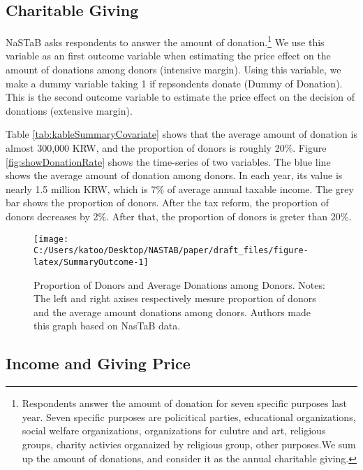 \documentclass[
]{article}
\begin{document}
\hypertarget{charitable-giving}{%
\subsection{Charitable Giving}\label{charitable-giving}}

NaSTaB asks respondents to answer the amount of donation.\footnote{Respondents answer the amount of donation for seven specific purposes last year. Seven specific purposes are policitical parties, educational organizations, social welfare organizations, organizations for culutre and art, religious groups, charity activies organaized by religious group, other purposes.We sum up the amount of donations, and consider it as the annual charitable giving.}
We use this variable as an first outcome variable when
estimating the price effect on the amount of donations among donors (intensive margin).
Using this variable, we make a dummy variable taking 1 if repsondents donate (Dummy of Donation).
This is the second outcome variable
to estimate the price effect on the decision of donations (extensive margin).

Table \ref{tab:kableSummaryCovariate} shows that
the average amount of donation is almost 300,000 KRW,
and the proportion of donors is roughly 20\%.
Figure \ref{fig:showDonationRate} shows the time-series of two variables.
The blue line shows the average amount of donation among donors.
In each year, its value is nearly 1.5 million KRW,
which is 7\% of average annual taxable income.
The grey bar shows the proportion of donors.
After the tax reform, the proportion of donors decreases by 2\%.
After that, the proportion of donors is greter than 20\%.

\begin{figure}[t]

{\centering \texttt{[image: C:/Users/katoo/Desktop/NASTAB/paper/draft\_files/figure-latex/SummaryOutcome-1]} 

}

\caption{Proportion of Donors and Average Donations among Donors. Notes: The left and right axises respectively mesure proportion of donors and the average amount donations among donors. Authors made this graph based on NasTaB data.}\label{fig:SummaryOutcome}
\end{figure}

\hypertarget{income-and-giving-price}{%
\subsection{Income and Giving Price}\label{income-and-giving-price}}
\end{document}
